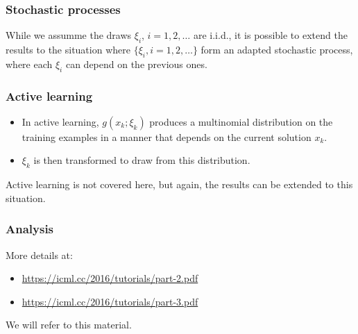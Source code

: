 \documentclass{beamer}
\begin{document}
\begin{frame}
\frametitle{Stochastic processes}

While we assumme the draws $\xi_i$, $i = 1,2,\ldots$ are i.i.d., it is possible to extend the results to the situation where $\lbrace \xi_i, i = 1,2,\ldots \rbrace$ form an adapted stochastic process, where each $\xi_i$ can depend on the previous ones.

\end{frame}

\begin{frame}
\frametitle{Active learning}

\begin{itemize}
\item 
In active learning, $g(x_k; \xi_k)$ produces a multinomial
distribution on the training examples in a manner that depends on the current solution $x_k$.
\item
$\xi_k$ is then transformed to draw from this distribution.
\end{itemize}

Active learning is not covered here, but again, the results can be extended to this situation.

\end{frame}

\begin{frame}
\frametitle{Analysis}

More details at:
\begin{itemize}
\item 
\url{https://icml.cc/2016/tutorials/part-2.pdf}
\item 
\url{https://icml.cc/2016/tutorials/part-3.pdf}
\end{itemize}

We will refer to this material.

\end{frame}
\end{document}
